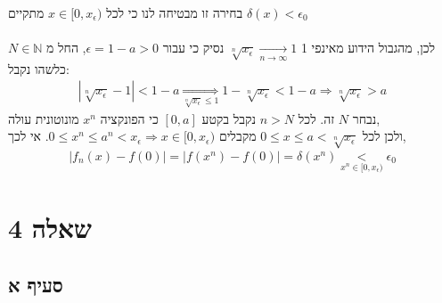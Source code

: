 \documentclass{article}
\newcommand\underrel[2]{\mathrel{\mathop{#2}\limits_{#1}}}
\def\naturals{\mathbb{N}}
\begin{document}
    בחירה זו מבטיחה לנו כי לכל $x\in [0, x_\epsilon)$ מתקיים $\delta(x)<\epsilon_0$
\\\\
לכן, מהגבול הידוע מאינפי 1 $\sqrt[n]{x_\epsilon}\xrightarrow[n\rightarrow \infty]{}1$ נסיק כי עבור $\epsilon=1-a>0$, החל מ $N\in\naturals$ כלשהו נקבל:
\begin{align*}
    |\sqrt[n]{x_\epsilon}-1|<1-a \underrel{\sqrt[n]{x_\epsilon}\leq 1}{\Rightarrow} 1 - \sqrt[n]{x_\epsilon} < 1 - a \Rightarrow \sqrt[n]{x_\epsilon} > a
\end{align*}
נבחר $N$ זה. לכל $n>N$ נקבל בקטע $[0,a]$ כי הפונקציה $x^n$ מונוטונית עולה,\\
ולכן לכל $0\leq x \leq a < \sqrt[n]{x_\epsilon}$ מקבלים $0\leq x^n \leq a^n < x_\epsilon\Rightarrow x\in [0, x_\epsilon)$.
אי לכך,
\begin{align*}
    |f_n(x)-f(0)| =|f(x^n)-f(0)|
    =\delta(x^n) \underrel{x^n\in[0,x_\epsilon)}{<} \epsilon_0
\end{align*}

\pagebreak

\section*{שאלה 4}

\subsection*{סעיף א}
\end{document}
